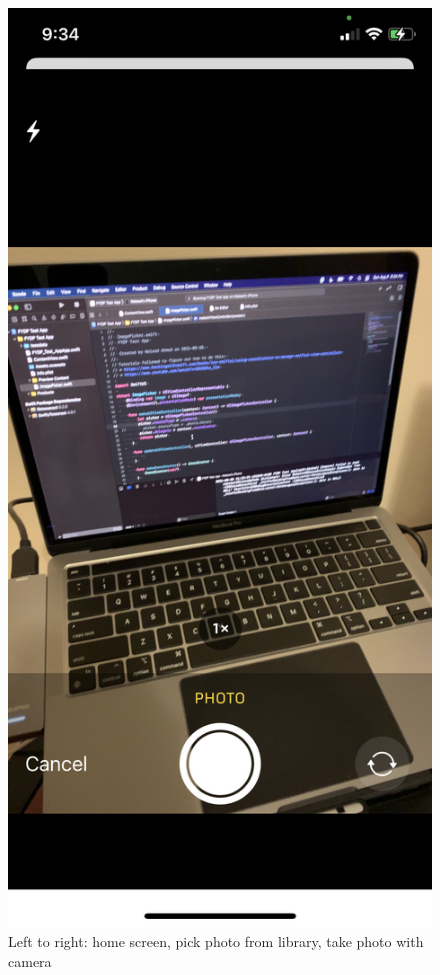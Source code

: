 \documentclass[a4paper,11pt]{article}
\begin{document}
\begin{figure}[H]
    \includegraphics[width={0.3\linewidth}]{img/ios_test_app/testapp_photo.jpeg}
    \caption{Left to right: home screen, pick photo from library, take photo with camera}
\end{figure}
\end{document}
